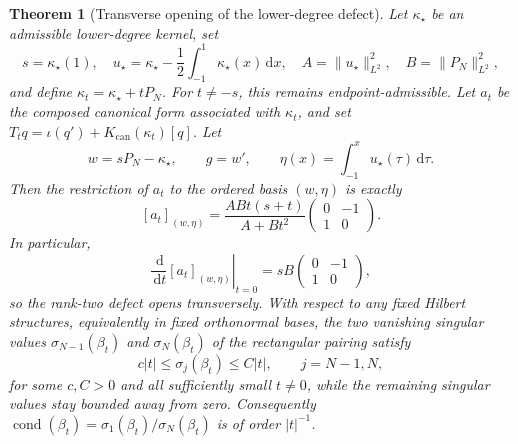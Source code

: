 \documentclass[11pt,a4paper]{article}
\newtheorem{theorem}{Theorem}[section]
\theoremstyle{definition}
\theoremstyle{remark}
\newcommand{\dd}{\,\mathrm{d}}
\begin{document}
\begin{theorem}[Transverse opening of the lower-degree defect]
\label{thm:transverseopening}
Let $\kappa_\star$ be an admissible lower-degree kernel, set
\begin{equation}\label{eq:transversedata}
 s=\kappa_\star(1),\quad
 u_\star=\kappa_\star-\frac12\int_{-1}^{1}\kappa_\star(x)\dd x,\quad
 A=\|u_\star\|_{L^2}^2,\quad B=\|P_N\|_{L^2}^2,
\end{equation}
and define $\kappa_t=\kappa_\star+tP_N$.  For $t\neq-s$, this remains endpoint-admissible.
Let $a_t$ be the composed canonical form associated with $\kappa_t$, and set
$T_tq=\iota(q')+K_{\mathrm{can}}(\kappa_t)[q]$.  Let
\begin{equation}\label{eq:transversewetag}
 w=sP_N-\kappa_\star,\qquad g=w',\qquad
 \eta(x)=\int_{-1}^{x}u_\star(\tau)\dd\tau.
\end{equation}
Then the restriction of $a_t$ to the ordered basis $(w,\eta)$ is exactly
\begin{equation}\label{eq:transverseblock}
 \boxed{
 [a_t]_{(w,\eta)}
 =\frac{ABt(s+t)}{A+Bt^2}
 \begin{pmatrix}0&-1\\1&0\end{pmatrix}.}
\end{equation}
In particular,
\begin{equation}\label{eq:transversederivative}
 \left.\frac{\dd}{\dd t}[a_t]_{(w,\eta)}\right|_{t=0}
 =sB\begin{pmatrix}0&-1\\1&0\end{pmatrix},
\end{equation}
so the rank-two defect opens transversely.  With respect to any fixed Hilbert structures,
equivalently in fixed orthonormal bases, the two vanishing singular values
$\sigma_{N-1}(\beta_t)$ and $\sigma_N(\beta_t)$ of the rectangular pairing
satisfy
\begin{equation}\label{eq:transversesvbounds}
 c|t|\leq\sigma_j(\beta_t)\leq C|t|,
 \qquad j=N-1,N,
\end{equation}
for some $c,C>0$ and all sufficiently small $t\neq0$, while the remaining singular values
stay bounded away from zero.  Consequently
$\operatorname{cond}(\beta_t)=\sigma_1(\beta_t)/\sigma_N(\beta_t)$ is of order $|t|^{-1}$.
\end{theorem}
\end{document}
